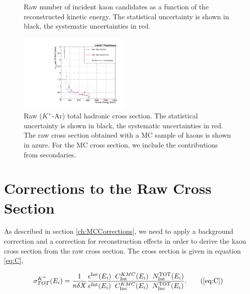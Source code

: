 \begin{figure}[]
\begin{minipage}[t]{0.45\textwidth}
\caption{Raw number of incident kaon candidates as a function of the reconstructed kinetic energy. The statistical uncertainty is shown in black, the systematic uncertainties in red.}
\label{fig:IncidentRawK}
\end{minipage}
\end{figure}



\begin{figure}
\centering  
\includegraphics[width=0.48\textwidth]{Chapter-7/Images/Plots_MCData_XS_StatSystK_WithDK.pdf}
\caption{Raw ($K^+$-Ar) total hadronic cross section. The statistical uncertainty is shown in black, the systematic uncertainties in red. The raw cross section obtained with a MC sample of kaons is shown in azure. For the MC cross section,  we include the contributions from secondaries. }
\label{fig:XSRawK}
\end{figure}


\section{Corrections to the Raw Cross Section}\label{ch:KaonXSCorrections}
As described in section \ref{ch:MCCorrections}, we need to apply a background correction and a correction for reconstruction effects in order to derive the  kaon cross section from the raw cross section.  The  cross section is given in equation \ref{eq:C}, 

\begin{equation}
   \sigma^{K^+}_{TOT}(E_{i})  = \frac{1}{n \delta X}\frac{ \epsilon^{\text{Inc}}(E_i)  \hspace{0.2cm} C^{K MC}_{\text{Int}} (E_{i}) \hspace{0.2cm} N^{\text{TOT}}_{\text{Int}} (E_{i}) }{   \epsilon^{\text{Int}}(E_i) \hspace{0.2cm} C^{K MC}_{\text{Inc}} (E_{i}) \hspace{0.2cm}  N^{\text{TOT}}_{\text{Inc}} (E_{i})}.
 \tag{\ref{eq:C}}
\end{equation}

